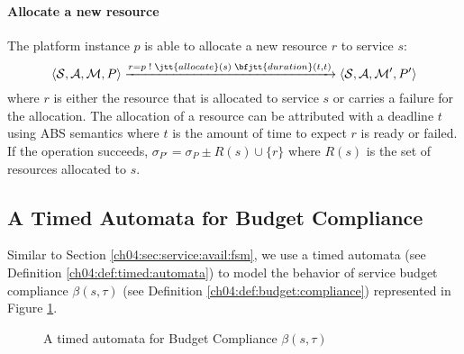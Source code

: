 \paragraph{Allocate a new resource}
The platform instance $p$ is able to allocate a new resource $r$ to service $s$:
\[
\langle \mathcal{S}, \mathcal{A}, \mathcal{M}, P \rangle
\xrightarrow[]{r = p \; ! \; \jtt{allocate}(s) \; \bfjtt{duration}(t,t)}
\langle \mathcal{S}, \mathcal{A}, \mathcal{M'}, P' \rangle
\]
where $r$ is either the resource that is allocated to service $s$ or carries a failure for the allocation.
The allocation of a resource can be attributed with a deadline $t$ using ABS semantics where $t$ is the amount of time to expect $r$ is ready or failed.
If the operation succeeds, $\sigma_{P'} = \sigma_{P} \pm R(s) \cup \{r\}$ where $R(s)$ is the set of resources allocated to $s$.


\subsection{A Timed Automata for Budget Compliance}
\label{ch04:sec:prop:budget}

Similar to Section \ref{ch04:sec:service:avail:fsm}, we use a timed automata (see Definition \ref{ch04:def:timed:automata}) to model the behavior of service budget compliance $\beta(s,\tau)$ (see Definition \ref{ch04:def:budget:compliance}) represented in Figure \ref{ch04:fig:fsm:budgetcomp}.
% 
\begin{figure}[h]
\centering
{}
\caption{A timed automata for Budget Compliance $\beta(s,\tau)$}
\label{ch04:fig:fsm:budgetcomp}
\end{figure}
% 

